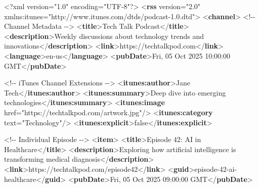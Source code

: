 \documentclass[
  letterpaper,
  DIV=11,
  numbers=noendperiod]{scrartcl}
\newenvironment{Shaded}{\begin{snugshade}}{\end{snugshade}}
\newcommand{\CommentTok}[1]{\textcolor[rgb]{0.37,0.37,0.37}{#1}}
\newcommand{\FunctionTok}[1]{\textcolor[rgb]{0.28,0.35,0.67}{#1}}
\newcommand{\KeywordTok}[1]{\textcolor[rgb]{0.00,0.23,0.31}{\textbf{#1}}}
\newcommand{\NormalTok}[1]{\textcolor[rgb]{0.00,0.23,0.31}{#1}}
\newcommand{\OtherTok}[1]{\textcolor[rgb]{0.00,0.23,0.31}{#1}}
\newcommand{\StringTok}[1]{\textcolor[rgb]{0.13,0.47,0.30}{#1}}
\begin{document}
\begin{Shaded}
\begin{Highlighting}[]
\FunctionTok{\textless{}?xml}\OtherTok{ version=}\StringTok{"1.0"}\OtherTok{ encoding=}\StringTok{"UTF{-}8"}\FunctionTok{?\textgreater{}}
\NormalTok{\textless{}}\KeywordTok{rss}\OtherTok{ version=}\StringTok{"2.0"}\OtherTok{ xmlns:itunes=}\StringTok{"http://www.itunes.com/dtds/podcast{-}1.0.dtd"}\NormalTok{\textgreater{}}
\NormalTok{  \textless{}}\KeywordTok{channel}\NormalTok{\textgreater{}}
    \CommentTok{\textless{}!{-}{-} Channel Metadata {-}{-}\textgreater{}}
\NormalTok{    \textless{}}\KeywordTok{title}\NormalTok{\textgreater{}Tech Talk Podcast\textless{}/}\KeywordTok{title}\NormalTok{\textgreater{}}
\NormalTok{    \textless{}}\KeywordTok{description}\NormalTok{\textgreater{}Weekly discussions about technology trends and innovations\textless{}/}\KeywordTok{description}\NormalTok{\textgreater{}}
\NormalTok{    \textless{}}\KeywordTok{link}\NormalTok{\textgreater{}https://techtalkpod.com\textless{}/}\KeywordTok{link}\NormalTok{\textgreater{}}
\NormalTok{    \textless{}}\KeywordTok{language}\NormalTok{\textgreater{}en{-}us\textless{}/}\KeywordTok{language}\NormalTok{\textgreater{}}
\NormalTok{    \textless{}}\KeywordTok{pubDate}\NormalTok{\textgreater{}Fri, 05 Oct 2025 10:00:00 GMT\textless{}/}\KeywordTok{pubDate}\NormalTok{\textgreater{}}
    
    \CommentTok{\textless{}!{-}{-} iTunes Channel Extensions {-}{-}\textgreater{}}
\NormalTok{    \textless{}}\KeywordTok{itunes:author}\NormalTok{\textgreater{}Jane Tech\textless{}/}\KeywordTok{itunes:author}\NormalTok{\textgreater{}}
\NormalTok{    \textless{}}\KeywordTok{itunes:summary}\NormalTok{\textgreater{}Deep dive into emerging technologies\textless{}/}\KeywordTok{itunes:summary}\NormalTok{\textgreater{}}
\NormalTok{    \textless{}}\KeywordTok{itunes:image}\OtherTok{ href=}\StringTok{"https://techtalkpod.com/artwork.jpg"}\NormalTok{/\textgreater{}}
\NormalTok{    \textless{}}\KeywordTok{itunes:category}\OtherTok{ text=}\StringTok{"Technology"}\NormalTok{/\textgreater{}}
\NormalTok{    \textless{}}\KeywordTok{itunes:explicit}\NormalTok{\textgreater{}false\textless{}/}\KeywordTok{itunes:explicit}\NormalTok{\textgreater{}}
    
    \CommentTok{\textless{}!{-}{-} Individual Episode {-}{-}\textgreater{}}
\NormalTok{    \textless{}}\KeywordTok{item}\NormalTok{\textgreater{}}
\NormalTok{      \textless{}}\KeywordTok{title}\NormalTok{\textgreater{}Episode 42: AI in Healthcare\textless{}/}\KeywordTok{title}\NormalTok{\textgreater{}}
\NormalTok{      \textless{}}\KeywordTok{description}\NormalTok{\textgreater{}Exploring how artificial intelligence is transforming medical diagnosis\textless{}/}\KeywordTok{description}\NormalTok{\textgreater{}}
\NormalTok{      \textless{}}\KeywordTok{link}\NormalTok{\textgreater{}https://techtalkpod.com/episode42\textless{}/}\KeywordTok{link}\NormalTok{\textgreater{}}
\NormalTok{      \textless{}}\KeywordTok{guid}\NormalTok{\textgreater{}episode{-}42{-}ai{-}healthcare\textless{}/}\KeywordTok{guid}\NormalTok{\textgreater{}}
\NormalTok{      \textless{}}\KeywordTok{pubDate}\NormalTok{\textgreater{}Fri, 05 Oct 2025 09:00:00 GMT\textless{}/}\KeywordTok{pubDate}\NormalTok{\textgreater{}}
      

\end{Highlighting}
\end{Shaded}
\end{document}
